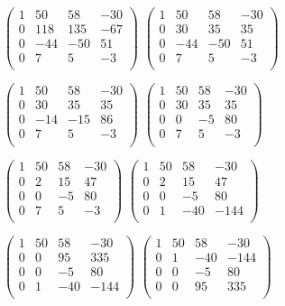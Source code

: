 \documentclass[10pt]{article}
\begin{document}
\begin{figure}[H]
\text{ = }
$\begin{pmatrix}
1 & 50 & 58 & -30 \\
0 & 118 & 135 & -67 \\
0 & -44 & -50 & 51 \\
0 & 7 & 5 & -3 \\
\end{pmatrix}$
\text{ = }
$\begin{pmatrix}
1 & 50 & 58 & -30 \\
0 & 30 & 35 & 35 \\
0 & -44 & -50 & 51 \\
0 & 7 & 5 & -3 \\
\end{pmatrix}$
\text{ = }

\text{ = }
$\begin{pmatrix}
1 & 50 & 58 & -30 \\
0 & 30 & 35 & 35 \\
0 & -14 & -15 & 86 \\
0 & 7 & 5 & -3 \\
\end{pmatrix}$
\text{ = }
$\begin{pmatrix}
1 & 50 & 58 & -30 \\
0 & 30 & 35 & 35 \\
0 & 0 & -5 & 80 \\
0 & 7 & 5 & -3 \\
\end{pmatrix}$
\text{ = }

\text{ = }
$\begin{pmatrix}
1 & 50 & 58 & -30 \\
0 & 2 & 15 & 47 \\
0 & 0 & -5 & 80 \\
0 & 7 & 5 & -3 \\
\end{pmatrix}$
\text{ = }
$\begin{pmatrix}
1 & 50 & 58 & -30 \\
0 & 2 & 15 & 47 \\
0 & 0 & -5 & 80 \\
0 & 1 & -40 & -144 \\
\end{pmatrix}$
\text{ = }

\text{ = }
$\begin{pmatrix}
1 & 50 & 58 & -30 \\
0 & 0 & 95 & 335 \\
0 & 0 & -5 & 80 \\
0 & 1 & -40 & -144 \\
\end{pmatrix}$
\text{ = }
$\begin{pmatrix}
1 & 50 & 58 & -30 \\
0 & 1 & -40 & -144 \\
0 & 0 & -5 & 80 \\
0 & 0 & 95 & 335 \\
\end{pmatrix}$
\text{ = }
\end{figure}
\end{document}
